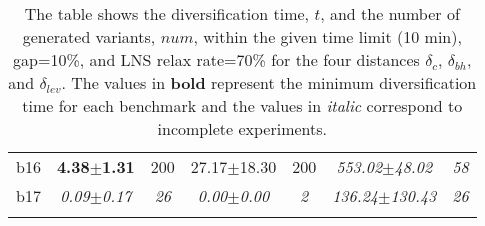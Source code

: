 \begin{longtable}{|l|c|c|c|c|c|c|}
b16&\textbf{4.38$\pm$1.31} & 200 &27.17$\pm$18.30 & 200 &\textit{553.02$\pm$48.02} & \textit{58 }
\\
b17&\textit{0.09$\pm$0.17} & \textit{26 }&\textit{0.00$\pm$0.00} & \textit{2 }&\textit{136.24$\pm$130.43} & \textit{26 }
\\
\hline
\caption{\label{tab:distances}{The table shows 
		      the diversification time, $t$, and the number of generated
		      variants, $num$, within the given time limit (10 min), gap=10\%,
		      and \ac{LNS} relax rate=70\%
		      for the four distances $\delta_c$, $\delta_{bh}$,
		      and $\delta_{lev}$.
		      The values in  \textbf{bold} represent the minimum 
		      diversification time for each benchmark and the values in \emph{italic} 
		      correspond to incomplete experiments.}}
\end{longtable}
